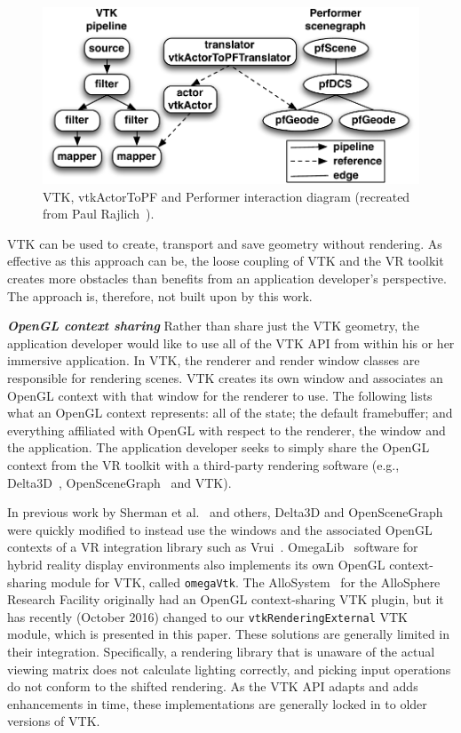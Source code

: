 \begin{figure}[h!]
  \centering
  \includegraphics[width=\linewidth]{images/vtkActorToPF.pdf}
  \caption{VTK, vtkActorToPF and Performer interaction diagram (recreated from Paul Rajlich~\cite{Leigh98limbo/vtk}).}
  \label{fig:vtkActorToPF}
\end{figure}

VTK can be used to create, transport and save geometry without rendering. As effective as this approach can be, the loose coupling of VTK and the VR toolkit creates more obstacles than benefits from an application developer's perspective. The approach is, therefore, not built upon by this work.

\textbf{\textit{OpenGL context sharing}} Rather than share just the VTK geometry, the application developer would like to use all of the VTK API from within his or her immersive application.
In VTK, the renderer and render window classes are responsible for rendering scenes.
VTK creates its own window and associates an OpenGL context with that window for the renderer to use.
The following lists what an OpenGL context represents: all of the state; the default framebuffer; and everything affiliated with OpenGL with respect to the renderer, the window and the application.
The application developer seeks to simply share the OpenGL context from the VR toolkit with a third-party rendering software (e.g., Delta3D~\cite{McDowell:2006}, OpenSceneGraph~\cite{Wang:2010} and VTK). 

In previous work by Sherman et al.~\cite{Sherman:2010} and others, Delta3D
and OpenSceneGraph were quickly modified to instead use the windows and the associated
OpenGL contexts of a VR integration library such as Vrui~\cite{Kreylos:2006}.  
OmegaLib~\cite{Febretti:2014} software for hybrid reality display environments also implements its own OpenGL context-sharing module for VTK, called \texttt{omegaVtk}. The AlloSystem~\cite{Amatriain:2009} for the AlloSphere Research Facility originally had an OpenGL context-sharing VTK plugin, but it has recently (October 2016) changed to our \texttt{vtkRenderingExternal} VTK module, which is presented in this paper.
These solutions are generally limited in their integration.
Specifically, a rendering library that is unaware of the actual
viewing matrix does not calculate lighting correctly, and
picking input operations do not conform to the shifted rendering. As the VTK API adapts and adds enhancements in time, these implementations are generally locked in to older versions of VTK.


